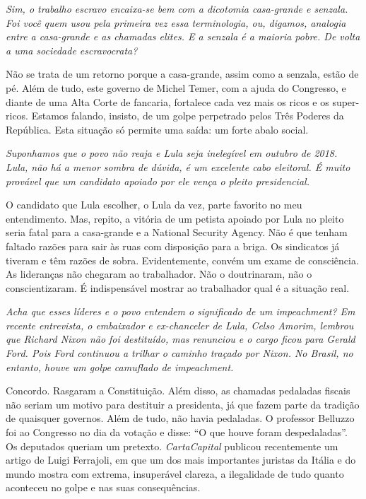 \itshape
 Sim, o trabalho escravo encaixa-se bem com a dicotomia
casa-grande e senzala. Foi você quem usou pela primeira vez essa
terminologia, ou, digamos, analogia entre a casa-grande e as chamadas
elites. E a senzala é a maioria pobre. De volta a uma sociedade
escravocrata?

\normalfont
Não se trata de um retorno porque a casa-grande, assim
como a senzala, estão de pé. Além de tudo, este governo de Michel Temer,
com a ajuda do Congresso, e diante de uma Alta Corte de fancaria,
fortalece cada vez mais os ricos e os super-ricos. Estamos falando,
insisto, de um golpe perpetrado pelos Três Poderes da República. Esta
situação só permite uma saída: um forte abalo social.

\itshape
 Suponhamos que o povo não reaja e Lula seja inelegível
em outubro de 2018. Lula, não há a menor sombra de dúvida, é um
excelente cabo eleitoral. É muito provável que um candidato apoiado por
ele vença o pleito presidencial.

\normalfont
O candidato que Lula escolher, o Lula da vez, parte
favorito no meu entendimento. Mas, repito, a vitória de um petista
apoiado por Lula no pleito seria fatal para a casa-grande e a National
Security Agency. Não é que tenham faltado razões para sair às ruas com
disposição para a briga. Os sindicatos já tiveram e têm razões de sobra.
Evidentemente, convém um exame de consciência. As lideranças não
chegaram ao trabalhador. Não o doutrinaram, não o conscientizaram. É
indispensável mostrar ao trabalhador qual é a situação real.

\itshape
 Acha que esses líderes e o povo entendem o significado
de um \emph{impeachment}? Em recente entrevista, o embaixador e
ex-chanceler de Lula, Celso Amorim, lembrou que Richard Nixon não foi
destituído, mas renunciou e o cargo ficou para Gerald Ford. Pois Ford
continuou a trilhar o caminho traçado por Nixon. No Brasil, no entanto,
houve um golpe camuflado de \emph{impeachment}.

\normalfont
Concordo. Rasgaram a Constituição. Além disso, as
chamadas pedaladas fiscais não seriam um motivo para destituir a
presidenta, já que fazem parte da tradição de quaisquer governos. Além
de tudo, não havia pedaladas. O professor Belluzzo foi ao Congresso no
dia da votação e disse: ``O que houve foram despedaladas''. Os deputados
queriam um pretexto. \emph{CartaCapital} publicou recentemente um artigo
de Luigi Ferrajoli, em que um dos mais importantes juristas da Itália e
do mundo mostra com extrema, insuperável clareza, a ilegalidade de tudo
quanto aconteceu no golpe e nas suas consequências.

